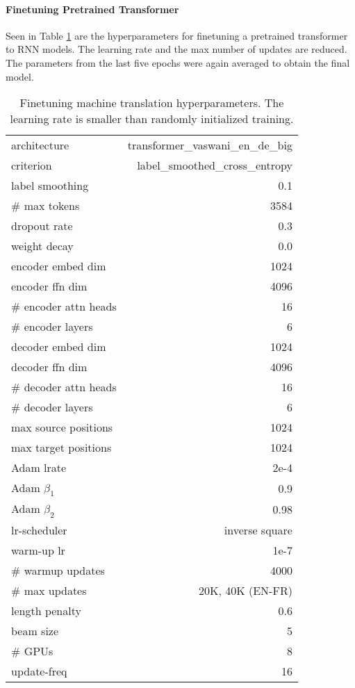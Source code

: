 \documentclass[11pt]{article}
\begin{document}
\paragraph{Finetuning Pretrained Transformer}
Seen in Table \ref{tab:mt-ft-hyp} are the hyperparameters for finetuning a pretrained transformer to RNN models. The learning rate and the max number of updates are reduced.
The parameters from the last five epochs were again averaged to obtain the final model.
\begin{table}[h]
\small
\centering
\begin{tabular}{ |l r|}
\hline
architecture & transformer\_vaswani\_en\_de\_big\\
criterion & label\_smoothed\_cross\_entropy\\
label smoothing & 0.1\\
\# max tokens & 3584 \\
dropout rate & 0.3\\
weight decay & 0.0 \\
encoder embed dim  & 1024\\
encoder ffn dim  & 4096\\
\# encoder attn heads & 16\\
\# encoder layers & 6 \\
decoder embed dim  & 1024\\
decoder ffn dim  & 4096\\
\# decoder attn heads & 16\\
\# decoder layers & 6 \\
max source positions & 1024 \\
max target positions & 1024 \\
Adam lrate& 2e-4 \\
Adam $\beta_1$& 0.9\\
Adam $\beta_2$& 0.98\\
lr-scheduler &  inverse square \\
warm-up lr & 1e-7 \\
\# warmup updates & 4000 \\
\# max updates &  20K, 40K (EN-FR) \\
length penalty & 0.6\\
beam size & 5\\
\# GPUs & 8 \\
update-freq & 16\\
\hline
\end{tabular}
\caption{Finetuning machine translation hyperparameters. The learning rate is smaller than randomly initialized training.}
\label{tab:mt-ft-hyp}
\end{table}
\end{document}
